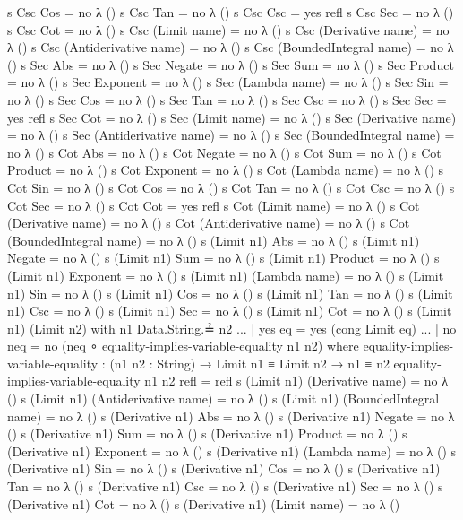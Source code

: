 \documentclass{report}
\begin{document}
\begin{code}
    s Csc Cos = no λ ()
    s Csc Tan = no λ ()
    s Csc Csc = yes refl
    s Csc Sec = no λ ()
    s Csc Cot = no λ ()
    s Csc (Limit name) = no λ ()
    s Csc (Derivative name) = no λ ()
    s Csc (Antiderivative name) = no λ ()
    s Csc (BoundedIntegral name) = no λ ()
    s Sec Abs = no λ ()
    s Sec Negate = no λ ()
    s Sec Sum = no λ ()
    s Sec Product = no λ ()
    s Sec Exponent = no λ ()
    s Sec (Lambda name) = no λ ()
    s Sec Sin = no λ ()
    s Sec Cos = no λ ()
    s Sec Tan = no λ ()
    s Sec Csc = no λ ()
    s Sec Sec = yes refl
    s Sec Cot = no λ ()
    s Sec (Limit name) = no λ ()
    s Sec (Derivative name) = no λ ()
    s Sec (Antiderivative name) = no λ ()
    s Sec (BoundedIntegral name) = no λ ()
    s Cot Abs = no λ ()
    s Cot Negate = no λ ()
    s Cot Sum = no λ ()
    s Cot Product = no λ ()
    s Cot Exponent = no λ ()
    s Cot (Lambda name) = no λ ()
    s Cot Sin = no λ ()
    s Cot Cos = no λ ()
    s Cot Tan = no λ ()
    s Cot Csc = no λ ()
    s Cot Sec = no λ ()
    s Cot Cot = yes refl
    s Cot (Limit name) = no λ ()
    s Cot (Derivative name) = no λ ()
    s Cot (Antiderivative name) = no λ ()
    s Cot (BoundedIntegral name) = no λ ()
    s (Limit n1) Abs = no λ ()
    s (Limit n1) Negate = no λ ()
    s (Limit n1) Sum = no λ ()
    s (Limit n1) Product = no λ ()
    s (Limit n1) Exponent = no λ ()
    s (Limit n1) (Lambda name) = no λ ()
    s (Limit n1) Sin = no λ ()
    s (Limit n1) Cos = no λ ()
    s (Limit n1) Tan = no λ ()
    s (Limit n1) Csc = no λ ()
    s (Limit n1) Sec = no λ ()
    s (Limit n1) Cot = no λ ()
    s (Limit n1) (Limit n2) with n1 Data.String.≟ n2
    ... | yes eq = yes (cong Limit eq)
    ... | no neq = no (neq ∘ equality-implies-variable-equality n1 n2)
      where
      equality-implies-variable-equality : (n1 n2 : String) →
             Limit n1 ≡ Limit n2 →
             n1 ≡ n2
      equality-implies-variable-equality n1 n2 refl = refl
    s (Limit n1) (Derivative name) = no λ ()
    s (Limit n1) (Antiderivative name) = no λ ()
    s (Limit n1) (BoundedIntegral name) = no λ ()
    s (Derivative n1) Abs = no λ ()
    s (Derivative n1) Negate = no λ ()
    s (Derivative n1) Sum = no λ ()
    s (Derivative n1) Product = no λ ()
    s (Derivative n1) Exponent = no λ ()
    s (Derivative n1) (Lambda name) = no λ ()
    s (Derivative n1) Sin = no λ ()
    s (Derivative n1) Cos = no λ ()
    s (Derivative n1) Tan = no λ ()
    s (Derivative n1) Csc = no λ ()
    s (Derivative n1) Sec = no λ ()
    s (Derivative n1) Cot = no λ ()
    s (Derivative n1) (Limit name) = no λ ()

\end{code}
\end{document}
